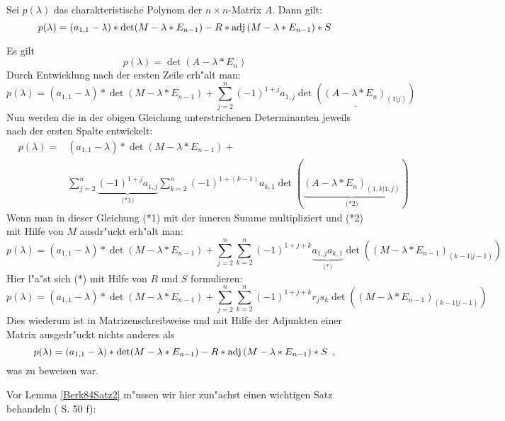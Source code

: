 \begin{lemma}
\label{Berk84Satz1}
    Sei $p(\lambda)$ das charakteristische Polynom der $n \times n$-Matrix
    $A$. Dann gilt:
    \[
        p(\lambda) = (a_{1,1} - \lambda) * \det(M - \lambda * E_{n-1})
                     - R * \mbox{\rm adj} \,(M - \lambda * E_{n-1}) * S
    \]
\end{lemma}
\begin{beweis}
    Es gilt \[ p(\lambda) = \det(A - \lambda * E_n) \]
    Durch Entwicklung nach der ersten Zeile erh"alt man:
    \[
        p(\lambda)= (a_{1,1} - \lambda) * \det(M - \lambda * E_{n-1}) +
        \sum_{j=2}^n (-1)^{1+j} a_{1,j}
        \underline{ \det( (A - \lambda * E_n)_{(1|j)} ) }
    \]
    Nun werden die in der obigen Gleichung unterstrichenen Determinanten
    jeweils nach der ersten Spalte entwickelt:
    \begin{eqnarray*}
        & p(\lambda)=
        & (a_{1,1} - \lambda) * \det(M - \lambda * E_{n-1}) +
    \\  & & \sum_{j=2}^n
            \underbrace{ (-1)^{1+j} a_{1,j} }_{ \mbox{(*1)} }
        \sum_{k=2}^n (-1)^{1+(k-1)} a_{k,1}
            \det(
                \underbrace{
                    (A - \lambda * E_n)_{(1,k|1,j)}
                }_{ \mbox{(*2)} }
            )
    \end{eqnarray*}
    Wenn man in dieser Gleichung (*1) mit der inneren Summe multipliziert
    und (*2) mit Hilfe von $M$ ausdr"uckt erh"alt man:
    \[
        p(\lambda)= (a_{1,1} - \lambda) * \det(M - \lambda * E_{n-1}) +
        \sum_{j=2}^n
        \sum_{k=2}^n (-1)^{1+j+k} \underbrace{ a_{1,j} a_{k,1} }_{ \mbox{(*)} }
            \det( (M - \lambda * E_{n-1})_{(k-1|j-1)} )
    \]
    Hier l"a"st sich (*) mit Hilfe von $R$ und $S$ formulieren:
    \[
        p(\lambda)= (a_{1,1} - \lambda) * \det(M - \lambda * E_{n-1}) +
        \sum_{j=2}^n
        \sum_{k=2}^n (-1)^{1+j+k} r_j s_k
            \det( (M - \lambda * E_{n-1})_{(k-1|j-1)} )
    \]
    Dies wiederum ist in Matrizenschreibweise und mit Hilfe der Adjunkten
    einer Matrix ausgedr"uckt nichts anderes als
    \[
        p(\lambda) = (a_{1,1} - \lambda) * \det(M - \lambda * E_{n-1})
                     - R * \mbox{\rm adj} \,(M - \lambda * E_{n-1}) * S \mbox{\hspace{0.5em},}
    \]
    was zu beweisen war.
\end{beweis}

Vor Lemma \ref{Berk84Satz2} m"ussen wir hier zun"achst einen wichtigen
Satz behandeln (\cite{MM64} S. 50 f):

